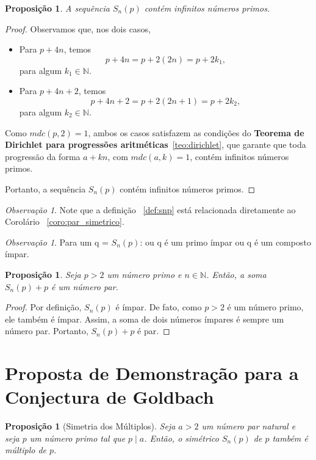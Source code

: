 \documentclass[a4paper,11pt]{article}
\newtheorem{proposition}[theorem]{Proposição}
\theoremstyle{definition}
\theoremstyle{remark}
\newtheorem{remark}[theorem]{Observação}
\begin{document}
\begin{otherlanguage}{brazil}
	\begin{proposition}
		A sequência \(S_n(p)\) contém infinitos números primos.
	\end{proposition}
	
	\begin{proof}
		Observamos que, nos dois casos,
		\begin{itemize}
			\item Para \(p + 4n\), temos
			\[
			p + 4n = p + 2(2n) = p + 2k_1,
			\]
			para algum \(k_1 \in \mathbb{N}\).
			
			\item Para \(p + 4n + 2\), temos
			\[
			p + 4n + 2 = p + 2(2n + 1) = p + 2k_2,
			\]
			para algum \(k_2 \in \mathbb{N}\).
		\end{itemize}
		
		Como \(mdc(p, 2) = 1\), ambos os casos satisfazem as condições do  \textbf{Teorema de Dirichlet para progressões aritméticas}~\ref{teo:dirichlet}, que garante que toda progressão da forma \(a + kn\), com \(mdc(a, k) = 1\), contém infinitos números primos.
		
		Portanto, a sequência \(S_n(p)\) contém infinitos números primos.
	\end{proof}
	
	\begin{remark}
		Note que a definição ~\ref{def:snp} está relacionada diretamente ao Corolário ~\ref{coro:par_simetrico}.
	\end{remark}
	
	\begin{remark}
		Para um q = \(S_n(p)\): ou q é um primo ímpar ou q é um composto ímpar.
	\end{remark}
	
	\begin{proposition}
		Seja \( p > 2 \) um número primo e \( n \in \mathbb{N} \). Então, a soma \( S_n(p) + p \) é um número par.
	\end{proposition}
	
	
	\begin{proof}
		Por definição, \( S_n(p) \) é ímpar. De fato, como \( p > 2 \) é um número primo, ele também é ímpar. Assim, a soma de dois números ímpares é sempre um número par. Portanto, \( S_n(p) + p \) é par. 
	\end{proof}
	
	
	\section{Proposta de Demonstração para a Conjectura de Goldbach}
	\begin{proposition}[Simetria dos Múltiplos]
		Seja \(a > 2\) um número par natural e seja \(p\) um número primo tal que \(p \mid a\). Então, o simétrico \(S_n(p)\) de \(p\) também é múltiplo de \(p\).
	\end{proposition}
	

\end{otherlanguage}
\end{document}
